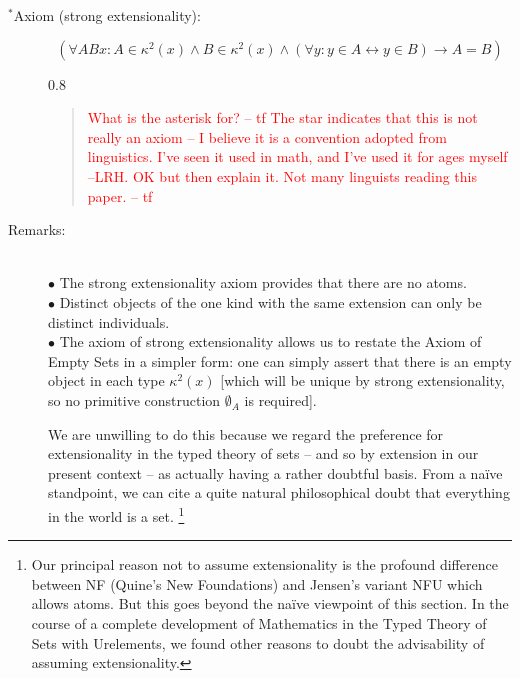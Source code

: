 \documentclass[12pt]{article}
\renewcommand{\smallpara}[1]{\begin{footnotesize}\begin{spacing}{0.8}\begin{quote} #1  \end{quote}\end{spacing}\end{footnotesize}}
\begin{document}
\begin{description}

\item[$^*$Axiom (strong extensionality):]  $$(\forall ABx:A \in \kappa^2(x) \wedge B \in \kappa^2(x) \wedge (\forall y:y \in A \leftrightarrow y \in B) \rightarrow A = B)$$

  \smallpara{\textcolor{red}{What is the asterisk for? -- tf   The star indicates that this is not really an axiom -- I believe it is a convention adopted from linguistics.  I've seen it used in math, and I've used it for ages myself --LRH.  OK but then explain it. Not many linguists reading this paper. -- tf}}

\item[Remarks:]\mbox{}  \\

  $\bullet$
  The strong extensionality axiom provides that there are no atoms.\\ $\bullet$   Distinct objects of the one kind with the same extension can only be distinct individuals.\\
  $\bullet$ The axiom of strong extensionality allows us to restate the Axiom of Empty Sets in a simpler form:  one can simply assert that there is an empty object in each type $\kappa^2(x)$ [which will be unique by strong extensionality, so no primitive construction $\emptyset_A$ is required].

We are unwilling to do this because we regard the preference for extensionality in the typed theory of sets -- and so by extension in our present context -- as actually having a rather doubtful basis.  From a na\"ive standpoint, we can cite a quite natural philosophical doubt that everything in the world is a set.  \footnote{Our principal reason not to assume extensionality is the profound difference between NF (Quine's New Foundations) and Jensen's variant NFU which allows atoms.  But this goes beyond the na\"ive viewpoint of this section.  In the course of a complete development of Mathematics in the Typed Theory of Sets with Urelements, we found other reasons to doubt the advisability of assuming extensionality.}
\end{description}
\end{document}
